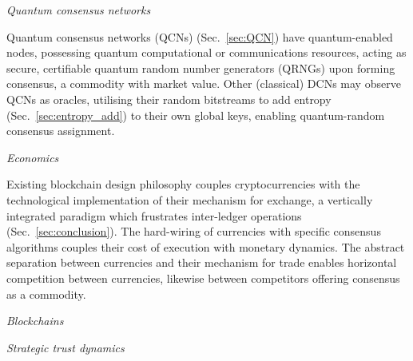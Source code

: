 \begin{center}\emph{Quantum consensus networks}\end{center}

Quantum consensus networks (QCNs) (Sec.~\ref{sec:QCN}) have quantum-enabled nodes, possessing quantum computational or communications resources, acting as secure, certifiable quantum random number generators (QRNGs) upon forming consensus, a commodity with market value. Other (classical) DCNs may observe QCNs as oracles, utilising their random bitstreams to add entropy (Sec.~\ref{sec:entropy_add}) to their own global keys, enabling quantum-random consensus assignment.

\begin{center}
	\resizebox{0.4\columnwidth}{!}{}
\end{center}

\begin{center}
	\resizebox{0.9\columnwidth}{!}{}
\end{center}

\begin{center}\emph{Economics}\end{center}

Existing blockchain design philosophy couples cryptocurrencies with the technological implementation of their mechanism for exchange, a vertically integrated paradigm which frustrates inter-ledger operations (Sec.~\ref{sec:conclusion}). The hard-wiring of currencies with specific consensus algorithms couples their cost of execution with monetary dynamics. The abstract separation between currencies and their mechanism for trade enables horizontal competition between currencies, likewise between competitors offering consensus as a commodity.

\begin{center}
	\resizebox{0.75\columnwidth}{!}{}
\end{center}

\begin{center}\emph{Blockchains}\end{center}

\begin{center}
	\resizebox{0.25\columnwidth}{!}{}
\end{center}

\begin{center}\emph{Strategic trust dynamics}\end{center}

\begin{center}
	\resizebox{0.4\columnwidth}{!}{}
\end{center}

%
%
%


